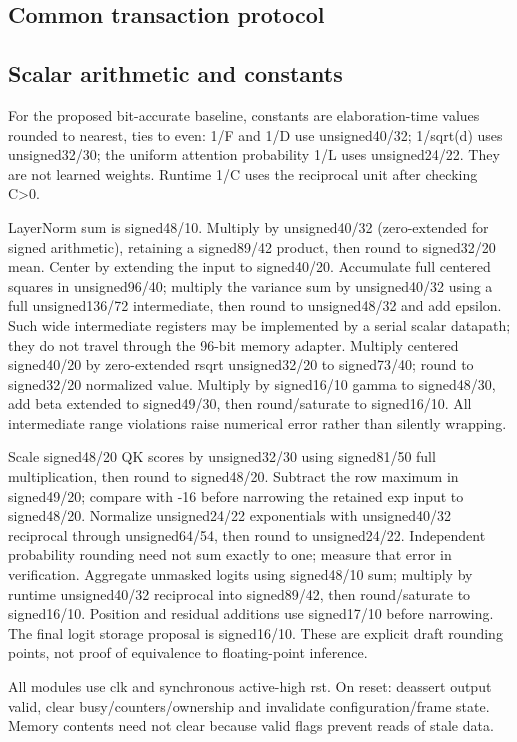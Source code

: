 \documentclass[11pt,a4paper]{article}
\begin{document}
\subsection{Common transaction protocol}

\subsection{Scalar arithmetic and constants}

For the proposed bit-accurate baseline, constants are elaboration-time values rounded to nearest, ties to even: 1/F and 1/D use unsigned40/32; 1/sqrt(d) uses unsigned32/30; the uniform attention probability 1/L uses unsigned24/22. They are not learned weights. Runtime 1/C uses the reciprocal unit after checking C>0.

LayerNorm sum is signed48/10. Multiply by unsigned40/32 (zero-extended for signed arithmetic), retaining a signed89/42 product, then round to signed32/20 mean. Center by extending the input to signed40/20. Accumulate full centered squares in unsigned96/40; multiply the variance sum by unsigned40/32 using a full unsigned136/72 intermediate, then round to unsigned48/32 and add epsilon. Such wide intermediate registers may be implemented by a serial scalar datapath; they do not travel through the 96-bit memory adapter. Multiply centered signed40/20 by zero-extended rsqrt unsigned32/20 to signed73/40; round to signed32/20 normalized value. Multiply by signed16/10 gamma to signed48/30, add beta extended to signed49/30, then round/saturate to signed16/10. All intermediate range violations raise numerical error rather than silently wrapping.

Scale signed48/20 QK scores by unsigned32/30 using signed81/50 full multiplication, then round to signed48/20. Subtract the row maximum in signed49/20; compare with -16 before narrowing the retained exp input to signed48/20. Normalize unsigned24/22 exponentials with unsigned40/32 reciprocal through unsigned64/54, then round to unsigned24/22. Independent probability rounding need not sum exactly to one; measure that error in verification. Aggregate unmasked logits using signed48/10 sum; multiply by runtime unsigned40/32 reciprocal into signed89/42, then round/saturate to signed16/10. Position and residual additions use signed17/10 before narrowing. The final logit storage proposal is signed16/10. These are explicit draft rounding points, not proof of equivalence to floating-point inference.

All modules use clk and synchronous active-high rst. On reset: deassert output valid, clear busy/counters/ownership and invalidate configuration/frame state. Memory contents need not clear because valid flags prevent reads of stale data.
\end{document}
